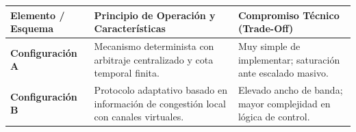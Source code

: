 \documentclass[9pt,a4paper]{extarticle}
\begin{document}
\vspace{1pt}
\begin{center}
\renewcommand{\arraystretch}{1.15}
\begin{tabularx}{\linewidth}{@{}p{3.2cm} X p{3.5cm}@{}}
\toprule
\textbf{Elemento / Esquema} & \textbf{Principio de Operación y Características} & \textbf{Compromiso Técnico (Trade-Off)} \\
\midrule
\textbf{Configuración A} & Mecanismo determinista con arbitraje centralizado y cota temporal finita. & Muy simple de implementar; saturación ante escalado masivo. \\
\textbf{Configuración B} & Protocolo adaptativo basado en información de congestión local con canales virtuales. & Elevado ancho de banda; mayor complejidad en lógica de control. \\
\bottomrule
\end{tabularx}
\end{center}
\end{document}
